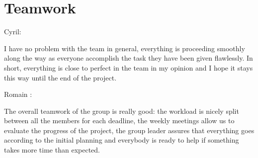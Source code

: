 \section{Teamwork}


Cyril:

I have no problem with the team in general, everything is proceeding smoothly along the way as everyone accomplish the task they have been given flawlessly. In short, everything is close to perfect in the team in my opinion and I hope it stays this way until the end of the project.

Romain :

The overall teamwork of the group is really good: the workload is nicely split between all the members for each deadline, the weekly meetings allow us to evaluate the progress of the project, the group leader assures that everything goes according to the initial planning and everybody is ready to help if something takes more time than expected.